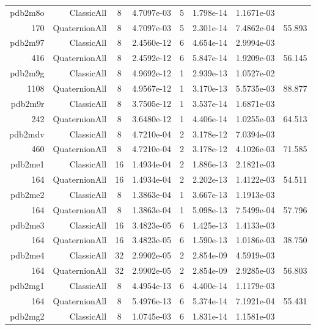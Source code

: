 \begin{xltabular}{\textwidth}{r|rcS[table-format=1.4e+2]cS[table-format=1.3e+2]S[table-format=1.4e+2]S[table-format=-1.3]}
pdb2m8o & ClassicAll & 8 & 4.7097e-03 & 5 & 1.798e-14 & 1.1671e-03 & \\
170 & QuaternionAll & 8 & 4.7097e-03 & 5 & 2.301e-14 & 7.4862e-04 & 55.893\\  \addlinespace
pdb2m97 & ClassicAll & 8 & 2.4560e-12 & 6 & 4.654e-14 & 2.9994e-03 & \\
416 & QuaternionAll & 8 & 2.4592e-12 & 6 & 5.847e-14 & 1.9209e-03 & 56.145\\  \addlinespace
pdb2m9g & ClassicAll & 8 & 4.9692e-12 & 1 & 2.939e-13 & 1.0527e-02 & \\
1108 & QuaternionAll & 8 & 4.9567e-12 & 1 & 3.170e-13 & 5.5735e-03 & 88.877\\  \addlinespace
pdb2m9r & ClassicAll & 8 & 3.7505e-12 & 1 & 3.537e-14 & 1.6871e-03 & \\
242 & QuaternionAll & 8 & 3.6480e-12 & 1 & 4.406e-14 & 1.0255e-03 & 64.513\\  \addlinespace
pdb2mdv & ClassicAll & 8 & 4.7210e-04 & 2 & 3.178e-12 & 7.0394e-03 & \\
460 & QuaternionAll & 8 & 4.7210e-04 & 2 & 3.178e-12 & 4.1026e-03 & 71.585\\  \addlinespace
pdb2me1 & ClassicAll & 16 & 1.4934e-04 & 2 & 1.886e-13 & 2.1821e-03 & \\
164 & QuaternionAll & 16 & 1.4934e-04 & 2 & 2.202e-13 & 1.4122e-03 & 54.511\\  \addlinespace
pdb2me2 & ClassicAll & 8 & 1.3863e-04 & 1 & 3.667e-13 & 1.1913e-03 & \\
164 & QuaternionAll & 8 & 1.3863e-04 & 1 & 5.098e-13 & 7.5499e-04 & 57.796\\  \addlinespace
pdb2me3 & ClassicAll & 16 & 3.4823e-05 & 6 & 1.425e-13 & 1.4133e-03 & \\
164 & QuaternionAll & 16 & 3.4823e-05 & 6 & 1.590e-13 & 1.0186e-03 & 38.750\\  \addlinespace
pdb2me4 & ClassicAll & 32 & 2.9902e-05 & 2 & 2.854e-09 & 4.5919e-03 & \\
164 & QuaternionAll & 32 & 2.9902e-05 & 2 & 2.854e-09 & 2.9285e-03 & 56.803\\  \addlinespace
pdb2mg1 & ClassicAll & 8 & 4.4954e-13 & 6 & 4.400e-14 & 1.1179e-03 & \\
164 & QuaternionAll & 8 & 5.4976e-13 & 6 & 5.374e-14 & 7.1921e-04 & 55.431\\  \addlinespace
pdb2mg2 & ClassicAll & 8 & 1.0745e-03 & 6 & 1.831e-14 & 1.1581e-03 & \\

\end{xltabular}
